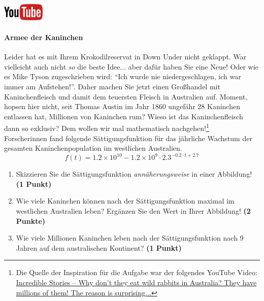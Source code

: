 \documentclass[a4paper, 9pt]{scrartcl}\usepackage[]{graphicx}\usepackage[]{xcolor}
\begin{document}
\hfill\href{https://youtu.be/Mr6eslls4J0}{\includegraphics[width =
  2cm]{img/youtube}} %
\hspace{2Ex}

\paragraph{Armee der Kaninchen}



Leider hat es mit Ihrem Krokodilreservat in Down Under nicht geklappt. War vielleicht
auch nicht \textit{so} die beste Idee... aber daf{\"u}r haben Sie eine Neue!
Oder wie es Mike Tyson zugeschrieben wird: "`Ich wurde nie
niedergeschlagen, ich war immer am Aufstehen!"'. Daher machen Sie jetzt
einen Gro{\ss}handel mit Kaninchenfleisch und damit dem teuersten Fleisch in
Australien auf. Moment, hopsen hier nicht, seit Thomas Austin im Jahr
1860 ungef{\"a}hr 28 Kaninchen entlassen hat,
Millionen von Kaninchen rum? Wieso ist das Kaninchenfleisch dann so
exklusiv? Dem wollen wir mal mathematisch nachgehen!\footnote{Die Quelle
  der Inspiration f{\"u}r die Aufgabe war der folgendes YouTube Video:
  \href{https://youtu.be/38fuOr3tdgc?si=Li7NL_FoByML8JtT}{ Incredible
    Stories -- Why don't they eat wild rabbits in Australia? They have
    millions of them! The reason is surprising...}}
\\

Forscherinnen fand folgende S{\"a}ttigungsfunktion f{\"u}r das j{\"a}hrliche Wachstum
der gesamten Kaninchenpopulation im westlichen Australien.
\begin{equation*}
  f(t) = \ensuremath{1.2\times 10^{10}} - \ensuremath{1.2\times 10^{9}} \cdot 2.3^{-0.2 \cdot t + 2.7}
\end{equation*}

\begin{enumerate}
\item Skizzieren Sie die S{\"a}ttigungsfunktion \textit{ann{\"a}herungsweise} in einer Abbildung! \textbf{(1
    Punkt)}
\item Wie viele Kaninchen k{\"o}nnen nach der S{\"a}ttigungsfunktion maximal im
  westlichen Australien leben? Erg{\"a}nzen Sie den Wert in Ihrer Abbildung! \textbf{(2 Punkte)}
\item Wie viele Millionen Kaninchen leben nach der S{\"a}ttigungsfunktion
  nach 9 Jahren auf dem australischen Kontinent? \textbf{(1
    Punkt)}
\end{enumerate}
\end{document}
